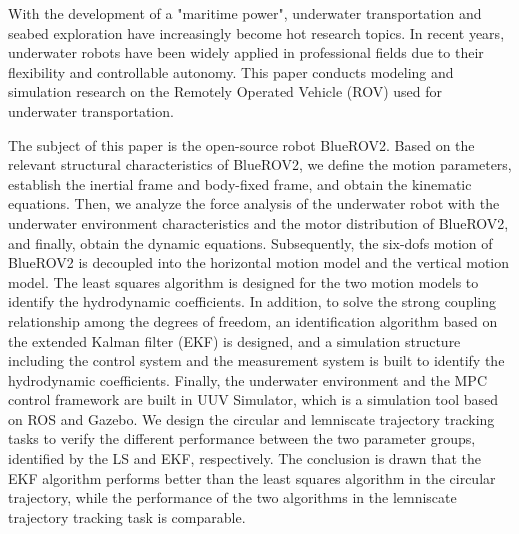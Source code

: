 \begin{abstracten}

With the development of a "maritime power", underwater transportation and seabed exploration have increasingly become hot research topics. In recent years, underwater robots have been widely applied in professional fields due to their flexibility and controllable autonomy. This paper conducts modeling and simulation research on the Remotely Operated Vehicle (ROV) used for underwater transportation. 

The subject of this paper is the open-source robot BlueROV2. Based on the relevant structural characteristics of BlueROV2, we define the motion parameters, establish the inertial frame and body-fixed frame, and obtain the kinematic equations. Then, we analyze the force analysis of the underwater robot with the underwater environment characteristics and the motor distribution of BlueROV2, and finally, obtain the dynamic equations. Subsequently, the six-dofs motion of BlueROV2 is decoupled into the horizontal motion model and the vertical motion model. The least squares algorithm is designed for the two motion models to identify the hydrodynamic coefficients. In addition, to solve the strong coupling relationship among the degrees of freedom, an identification algorithm based on the extended Kalman filter (EKF) is designed, and a simulation structure including the control system and the measurement system is built to identify the hydrodynamic coefficients. Finally, the underwater environment and the MPC control framework are built in UUV Simulator, which is a simulation tool based on ROS and Gazebo. We design the circular and lemniscate trajectory tracking tasks to verify the different performance between the two parameter groups, identified by the LS and EKF, respectively. The conclusion is drawn that the EKF algorithm performs better than the least squares algorithm in the circular trajectory, while the performance of the two algorithms in the lemniscate trajectory tracking task is comparable.

\end{abstracten}